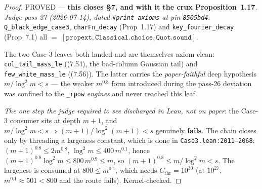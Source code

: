 \begin{proof}
  \leanok
  PROVED --- \textbf{this closes \S7, and with it the crux Proposition~1.17}.  \emph{Judge
  pass 27 (2026-07-14), dated \texttt{\#print axioms} at pin \texttt{8505bd4}}:
  \texttt{Q\_black\_edge\_case3}, \texttt{charFn\_decay} (Prop~1.17) and
  \texttt{key\_fourier\_decay} (Prop~7.1) all \(=\)
  \([\texttt{propext}, \texttt{Classical.choice}, \texttt{Quot.sound}]\).

  The two Case-3 leaves both landed and are themselves axiom-clean:
  \texttt{col\_tail\_mass\_le} ((7.54), the bad-column Gaussian tail) and
  \texttt{few\_white\_mass\_le} ((7.56)).  The latter carries the \emph{paper-faithful} deep
  hypothesis \(m/\log^2 m < s\) --- the weaker \(m^{0.8}\) form introduced during the pass-26
  deviation was confined to the \texttt{\_rpow} \emph{engines} and never reached this leaf.

  \emph{The one step the judge required to see discharged in Lean, not on paper}: the
  Case-3 consumer sits at depth \(m+1\), and \(m/\log^2 m < s \Rightarrow (m+1)/\log^2(m+1) < s\)
  genuinely \textbf{fails}.  The chain closes only by threading a largeness constant, which is
  done in \texttt{Case3.lean:2011--2068}: \((m+1)^{0.8}\le 2m^{0.8}\), \(\log^2 m \le 400\,m^{0.1}\),
  hence \((m+1)^{0.8}\log^2 m \le 800\, m^{0.9}\le m\), so \((m+1)^{0.8}\le m/\log^2 m < s\).
  The largeness is consumed at \(800 \le m^{0.1}\), which needs \(C_{\mathrm{thr}} = 10^{30}\)
  (at \(10^{27}\), \(m^{0.1}\approx 501 < 800\) and the route fails).  Kernel-checked.
\end{proof}
